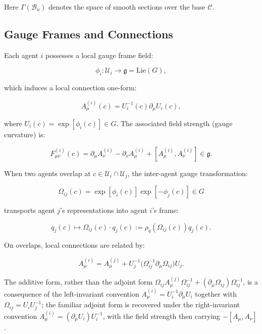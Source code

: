 \documentclass[twoside,11pt]{article}
\begin{document}
Here $\Gamma(\mathcal{B}_u)$ denotes the space of smooth sections over the base $\mathcal{C}$.

\subsection{Gauge Frames and Connections}
Each agent $i$ possesses a local gauge frame field:

\begin{equation}
\phi_i: \mathcal{U}_i \to \mathfrak{g} = \text{Lie}(G),
\end{equation}

which induces a local connection one-form:

\begin{equation}
A^{(i)}_\mu(c) = U_i^{-1}(c) \partial_\mu U_i(c),
\end{equation}

where $U_i(c) = \exp[\phi_i(c)] \in G$. The associated field strength (gauge curvature) is:

\begin{equation}
F^{(i)}_{\mu\nu}(c) = \partial_\mu A^{(i)}_\nu - \partial_\nu A^{(i)}_\mu + [A^{(i)}_\mu, A^{(i)}_\nu] \in \mathfrak{g}.
\end{equation}

When two agents overlap at $c \in \mathcal{U}_i \cap \mathcal{U}_j$, the inter-agent gauge transformation:

\begin{equation}
\Omega_{ij}(c) = \exp[\phi_i(c)] \exp[-\phi_j(c)] \in G
\end{equation}

transports agent $j$'s representations into agent $i$'s frame:

\begin{equation}
q_j(c) \mapsto \Omega_{ij}(c) \cdot q_j(c) := \rho_q(\Omega_{ij}(c))q_j(c).
\end{equation}

On overlaps, local connections are related by:

\begin{equation}
A^{(i)}_\mu = A^{(j)}_\mu + U_j^{-1}\bigl(\Omega_{ij}^{-1} \partial_\mu \Omega_{ij}\bigr) U_j.
\end{equation}

The additive form, rather than the adjoint form $\Omega_{ij} A^{(j)}_\mu \Omega_{ij}^{-1} + (\partial_\mu \Omega_{ij}) \Omega_{ij}^{-1}$, is a consequence of the left-invariant convention $A^{(i)}_\mu = U_i^{-1}\partial_\mu U_i$ together with $\Omega_{ij} = U_i U_j^{-1}$; the familiar adjoint form is recovered under the right-invariant convention $A^{(i)}_\mu = (\partial_\mu U_i) U_i^{-1}$, with the field strength then carrying $-[A_\mu, A_\nu]$.
\end{document}
